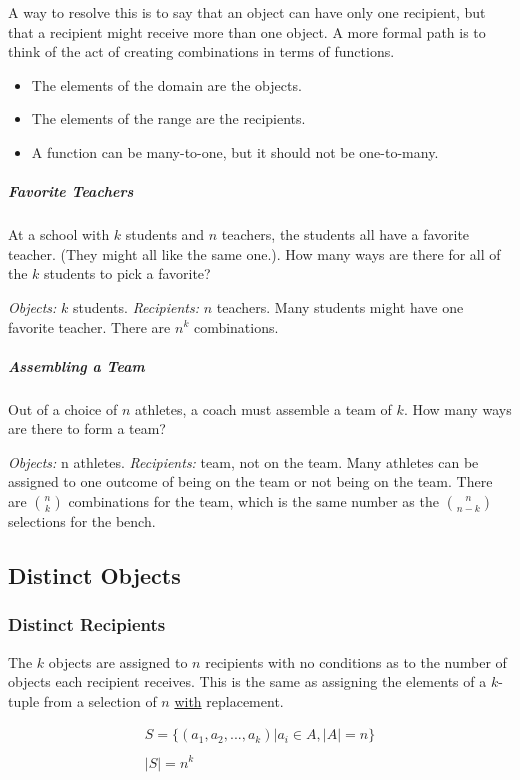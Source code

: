 A way to resolve this is to say that an object can have only one recipient, but that a recipient might receive more than one object. A more formal path is to think of the act of creating combinations in terms of functions. 

\begin{itemize}
\item The elements of the domain are the objects. 
\item The elements of the range are the recipients. 
\item A function can be many-to-one, but it should not be one-to-many. 
\end{itemize}

\subparagraph{Favorite Teachers} At a school with $k$ students and $n$ teachers, the students all have a favorite teacher. (They might all like the same one.). How many ways are there for all of the $k$ students to pick a favorite? 

\textit{Objects:} $k$ students. \textit{Recipients:} $n$ teachers. Many students might have one favorite teacher. There are $n^k$ combinations. 

\subparagraph{Assembling a Team} Out of a choice of $n$ athletes, a coach must assemble a team of $k$. How many ways are there to form a team? 

\textit{Objects:} n athletes. \textit{Recipients:} team, not on the team. Many athletes can be assigned to one outcome of being on the team or not being on the team. There are ${n \choose k}$ combinations for the team, which is the same number as the ${n \choose n-k}$ selections for the bench. 


\subsection{Distinct Objects}


\subsubsection{Distinct Recipients}
The $k$ objects are assigned to $n$ recipients with no conditions as to the number of objects each recipient receives. This is the same as assigning the elements of a $k$-tuple from a selection of $n$ \underline{with} replacement.

\begin{equation}	
\begin{array}{l}
S = \{ (a_1,a_2,...,a_k) | a_i \in A, |A| = n \}\\
\\
|S| = n^k
\end{array}
\end{equation}



